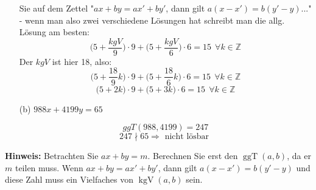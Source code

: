 \documentclass{article} %
\begin{document}
\begin{enumerate}
\begin{mybox}
        Sie auf dem Zettel "$ax + by = ax' + by'$, dann gilt $a(x - x') = b(y' - y)$..." - wenn man also zwei verschiedene Lösungen hat schreibt man die allg. Lösung am besten: 
        \[\big( 5 + \frac{kgV}{9}\big) \cdot 9 + \big( 5 + \frac{kgV}{6}\big) \cdot 6 = 15 \ \ \forall k \in \mathbb{Z} \]
        Der $kgV$ ist hier 18, also: 
        \[\big( 5 + \frac{18}{9} k \big) \cdot 9 + \big( 5 + \frac{18}{6} k \big) \cdot 6 = 15 \ \ \forall k \in \mathbb{Z} \]
        \[\big( 5 + 2 k \big) \cdot 9 + \big( 5 + 3 k \big) \cdot 6 = 15 \ \ \forall k \in \mathbb{Z} \]
        \color{black}
        \end{mybox}
        \item[(b)] $988x + 4199y = 65$
        \begin{mybox}
        \[ggT(988, 4199) = 247\]
        \[247 \nmid  65 \Rightarrow \text{ nicht lösbar }\]
        \end{mybox}
    \end{enumerate}
    \textbf{Hinweis:} Betrachten Sie $ax + by = m$. Berechnen Sie erst den $\operatorname{ggT}(a, b)$, da er $m$ teilen muss. Wenn $ax + by = ax' + by'$, dann gilt $a(x - x') = b(y' - y)$ und diese Zahl muss ein Vielfaches von $\operatorname{kgV}(a, b)$ sein.
    \newpage 
\end{document}

